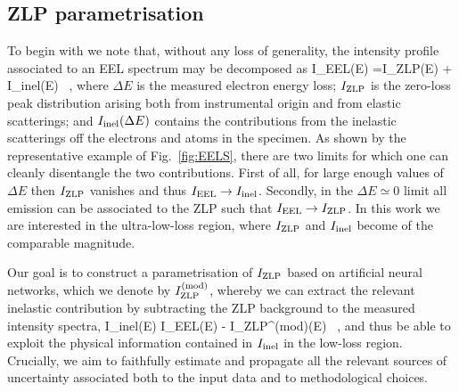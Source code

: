 \subsection{ZLP parametrisation}
\label{sec:parametrisation}

To begin with we note that, without any loss of generality, the intensity profile
associated to an EEL spectrum may be decomposed as
\be
\label{eq:IeelTot}
I_{\rm EEL}(\Delta E) =I_{\rm ZLP}(\Delta E) + I_{\rm inel}(\Delta E) \, ,
\ee
where $\Delta E$ is the measured electron energy loss; $I_{\rm ZLP}$ is the zero-loss peak
distribution arising both from instrumental origin  and from elastic scatterings; and
$I_{\rm inel}(\Delta E)$ contains the contributions from the
inelastic scatterings off the electrons and atoms in the specimen.
%
As shown by the representative example of Fig.~\ref{fig:EELS}, there are two limits
for which one can cleanly disentangle the two contributions.
%
First of all, for large enough values of
$\Delta E$ then
$I_{\rm ZLP}$ vanishes and thus $I_{\rm EEL} \to I_{\rm inel}$.
%
Secondly, in the $\Delta E\simeq 0$ limit all emission can be associated to
 the ZLP such that $I_{\rm EEL}\to  I_{\rm ZLP}$.
%
In this work we are interested in the ultra-low-loss region, where $I_{\rm ZLP}$ and $I_{\rm inel}$
become of the comparable magnitude.

Our goal is to construct a parametrisation of $I_{\rm ZLP}$ based on artificial
neural networks, which we denote by $I_{\rm ZLP}^{\rm (mod)}$, whereby we
can extract the relevant inelastic contribution by subtracting the
ZLP background to the measured intensity spectra,
\be
\label{eq:ZLPseparation}
I_{\rm inel}(\Delta E) \simeq I_{\rm EEL}(\Delta E) - I_{\rm ZLP}^{\rm (mod)}(\Delta E) \, ,
\ee
and thus be able to exploit the physical information contained in $I_{\rm inel}$ in
the low-loss region.
%
Crucially, we aim to faithfully estimate and propagate all the relevant sources of uncertainty associated
both to the input data and to methodological choices.

